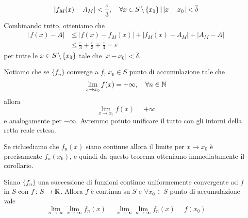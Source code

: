 \documentclass[a4paper]{article}
\begin{document}
\begin{snippetproof}{}
    \[
        |f_{M}(x) - A_{M}| < \frac{\varepsilon}{3},
        \quad \forall x \in S \,\backslash\, \{x_0\} \,|\, |x-x_0| < \overline\delta
    \]
    Combinando tutto, otteniamo che
    \begin{align*}
        |f(x) - A| &\leq |f(x) - f_{M}(x)| + |f_{M}(x) - A_{M}| + |A_{M} - A| \\
        &\leq \frac{\varepsilon}{3} + \frac{\varepsilon}{3} + \frac{\varepsilon}{3} = \varepsilon
    \end{align*}
    per tutte le \(x \in S \,\backslash\, \{x_0\}\) tale che \(|x-x_0| < \overline\delta\).
\end{snippetproof}

Notiamo che se \(\{f_n\}\) converge a \(f\), \(x_0 \in S\)
punto di accumulazione tale che
\[
    \lim_{x\to x_0} f(x) = +\infty, \quad \forall n \in \mathbb{N}
\]
allora
\[
    \lim_{x \to x_0} f(x) = +\infty
\]
e analogamente per \(-\infty\).
Avremmo potuto unificare il tutto con gli intorni della retta reale estesa.


Se richiediamo che \(f_n(x)\) siano continue allora il limite per \(x \to x_0\)
è precisamente \(f_n(x_0)\), e quindi da questo teorema otteniamo immediatamente il corollario.

\begin{snippetcorollary}{}
    Siano \(\{f_n\}\) una successione di funzioni continue uniformemente convergente ad \(f\)
    in \(S\) con \(f \colon S \to \mathbb{R}\).
    Allora \(f\) è continua su \(S\) e \(\forall x_0 \in S\) punto di accumulazione vale
    \[
        \lim_{n \to \infty} \lim_{x \to \infty} f_n(x)
        = \lim_{x \to \infty} \lim_{n \to \infty} f_n(x) = f(x_0)
    \]
\end{snippetcorollary}
\end{document}
